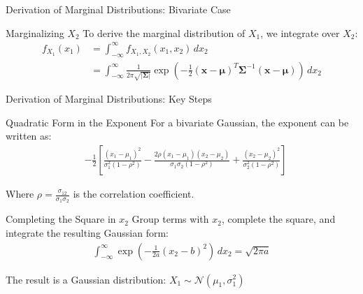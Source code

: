 \documentclass{beamer}
\begin{document}
\begin{frame}{Derivation of Marginal Distributions: Bivariate Case}
  \begin{block}{Marginalizing $X_2$}
    To derive the marginal distribution of $X_1$, we integrate over $X_2$:
    \begin{align*}
      f_{X_1}(x_1) &= \int_{-\infty}^{\infty} f_{X_1,X_2}(x_1, x_2) \, dx_2\\
      &= \int_{-\infty}^{\infty} \frac{1}{2\pi \sqrt{|\boldsymbol{\Sigma}|}} \exp\left(-\frac{1}{2}(\mathbf{x}-\boldsymbol{\mu})^T \boldsymbol{\Sigma}^{-1} (\mathbf{x}-\boldsymbol{\mu})\right) \, dx_2
    \end{align*}
  \end{block}
\end{frame}

\begin{frame}{Derivation of Marginal Distributions: Key Steps}
  \begin{block}{Quadratic Form in the Exponent}
    For a bivariate Gaussian, the exponent can be written as:
    \begin{align*}
      &-\frac{1}{2} \left[ \frac{(x_1-\mu_1)^2}{\sigma_1^2(1-\rho^2)} - \frac{2\rho(x_1-\mu_1)(x_2-\mu_2)}{\sigma_1\sigma_2(1-\rho^2)} + \frac{(x_2-\mu_2)^2}{\sigma_2^2(1-\rho^2)} \right]
    \end{align*}
    
    Where $\rho = \frac{\sigma_{12}}{\sigma_1\sigma_2}$ is the correlation coefficient.
  \end{block}
  
  \begin{block}{Completing the Square in $x_2$}
    Group terms with $x_2$, complete the square, and integrate the resulting Gaussian form:
    \begin{align*}
      \int_{-\infty}^{\infty} \exp\left(-\frac{1}{2a}(x_2-b)^2\right) \, dx_2 = \sqrt{2\pi a}
    \end{align*}
    
    The result is a Gaussian distribution: $X_1 \sim \mathcal{N}(\mu_1, \sigma_1^2)$
  \end{block}
\end{frame}
\end{document}

